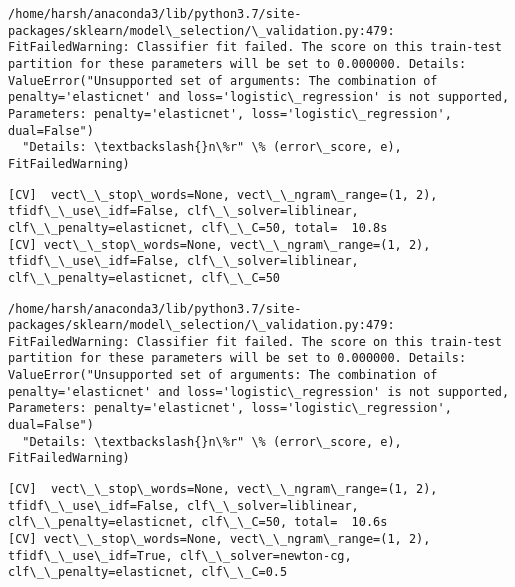\documentclass[11pt]{article}
\begin{document}
    \begin{Verbatim}[commandchars=\\\{\}]
/home/harsh/anaconda3/lib/python3.7/site-packages/sklearn/model\_selection/\_validation.py:479: FitFailedWarning: Classifier fit failed. The score on this train-test partition for these parameters will be set to 0.000000. Details: 
ValueError("Unsupported set of arguments: The combination of penalty='elasticnet' and loss='logistic\_regression' is not supported, Parameters: penalty='elasticnet', loss='logistic\_regression', dual=False")
  "Details: \textbackslash{}n\%r" \% (error\_score, e), FitFailedWarning)

    \end{Verbatim}

    \begin{Verbatim}[commandchars=\\\{\}]
[CV]  vect\_\_stop\_words=None, vect\_\_ngram\_range=(1, 2), tfidf\_\_use\_idf=False, clf\_\_solver=liblinear, clf\_\_penalty=elasticnet, clf\_\_C=50, total=  10.8s
[CV] vect\_\_stop\_words=None, vect\_\_ngram\_range=(1, 2), tfidf\_\_use\_idf=False, clf\_\_solver=liblinear, clf\_\_penalty=elasticnet, clf\_\_C=50 

    \end{Verbatim}

    \begin{Verbatim}[commandchars=\\\{\}]
/home/harsh/anaconda3/lib/python3.7/site-packages/sklearn/model\_selection/\_validation.py:479: FitFailedWarning: Classifier fit failed. The score on this train-test partition for these parameters will be set to 0.000000. Details: 
ValueError("Unsupported set of arguments: The combination of penalty='elasticnet' and loss='logistic\_regression' is not supported, Parameters: penalty='elasticnet', loss='logistic\_regression', dual=False")
  "Details: \textbackslash{}n\%r" \% (error\_score, e), FitFailedWarning)

    \end{Verbatim}

    \begin{Verbatim}[commandchars=\\\{\}]
[CV]  vect\_\_stop\_words=None, vect\_\_ngram\_range=(1, 2), tfidf\_\_use\_idf=False, clf\_\_solver=liblinear, clf\_\_penalty=elasticnet, clf\_\_C=50, total=  10.6s
[CV] vect\_\_stop\_words=None, vect\_\_ngram\_range=(1, 2), tfidf\_\_use\_idf=True, clf\_\_solver=newton-cg, clf\_\_penalty=elasticnet, clf\_\_C=0.5 

    \end{Verbatim}
\end{document}
